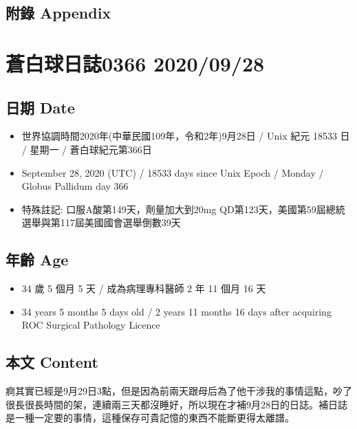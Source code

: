 \documentclass[
]{article}
\providecommand{\tightlist}{%
  \setlength{\itemsep}{0pt}\setlength{\parskip}{0pt}}
\begin{document}
\hypertarget{ux9644ux9304-appendix-25}{%
\subsection{附錄 Appendix}\label{ux9644ux9304-appendix-25}}

\hypertarget{ux84bcux767dux7403ux65e5ux8a8c0366-20200928}{%
\section{蒼白球日誌0366
2020/09/28}\label{ux84bcux767dux7403ux65e5ux8a8c0366-20200928}}

\hypertarget{ux65e5ux671f-date-26}{%
\subsection{日期 Date}\label{ux65e5ux671f-date-26}}

\begin{itemize}
\tightlist
\item
  世界協調時間2020年(中華民國109年，令和2年)9月28日 / Unix 紀元 18533 日
  / 星期一 / 蒼白球紀元第366日
\item
  September 28, 2020 (UTC) / 18533 days since Unix Epoch / Monday /
  Globus Pallidum day 366
\item
  特殊註記: 口服A酸第149天，劑量加大到20mg
  QD第123天，美國第59屆總統選舉與第117屆美國國會選舉倒數39天
\end{itemize}

\hypertarget{ux5e74ux9f61-age-26}{%
\subsection{年齡 Age}\label{ux5e74ux9f61-age-26}}

\begin{itemize}
\tightlist
\item
  34 歲 5 個月 5 天 / 成為病理專科醫師 2 年 11 個月 16 天
\item
  34 years 5 months 5 days old / 2 years 11 months 16 days after
  acquiring ROC Surgical Pathology Licence
\end{itemize}

\hypertarget{ux672cux6587-content-26}{%
\subsection{本文 Content}\label{ux672cux6587-content-26}}

痾其實已經是9月29日3點，但是因為前兩天跟母后為了他干涉我的事情這點，吵了很長很長時間的架，連續兩三天都沒睡好，所以現在才補9月28日的日誌。補日誌是一種一定要的事情，這種保存可貴記憶的東西不能斷更得太離譜。
\end{document}
